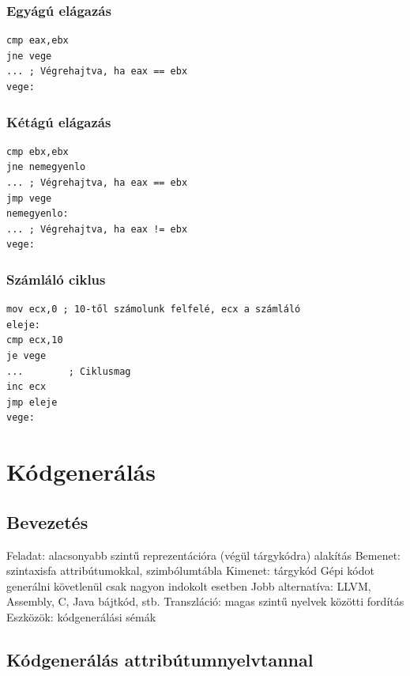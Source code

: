 \documentclass[12pt,a4paper]{article}
\begin{document}
\subsubsection{Egyágú elágazás}

\begin{verbatim}
cmp eax,ebx
jne vege
... ; Végrehajtva, ha eax == ebx
vege:\end{verbatim}

\subsubsection{Kétágú elágazás}

\begin{verbatim}
cmp ebx,ebx
jne nemegyenlo
... ; Végrehajtva, ha eax == ebx
jmp vege
nemegyenlo:
... ; Végrehajtva, ha eax != ebx
vege:\end{verbatim}

\subsubsection{Számláló ciklus}

\begin{verbatim}
mov ecx,0 ; 10-től számolunk felfelé, ecx a számláló
eleje:
cmp ecx,10
je vege
...        ; Ciklusmag
inc ecx
jmp eleje
vege:\end{verbatim}

\pagebreak

\section{Kódgenerálás}

\subsection{Bevezetés}

\begin{outline}
	\1 Feladat: alacsonyabb szintű reprezentációra (végül tárgykódra) alakítás
	\1 Bemenet: szintaxisfa attribútumokkal, szimbólumtábla
	\1 Kimenet: tárgykód
		\2 Gépi kódot generálni követlenül csak nagyon indokolt esetben
		\2 Jobb alternatíva: LLVM, Assembly, C, Java bájtkód, stb.
		\2 Transzláció: magas szintű nyelvek közötti fordítás
	\1 Eszközök: kódgenerálási sémák
\end{outline}

\subsection{Kódgenerálás attribútumnyelvtannal}
\end{document}
